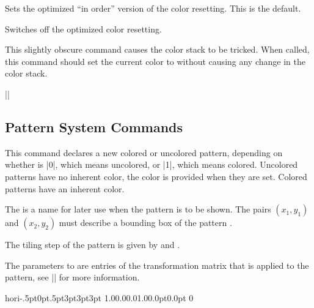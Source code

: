 \begin{command}{\pgfsys@color@reset@inordertrue}
    Sets the optimized ``in order'' version of the color resetting. This is the
    default.
\end{command}

\begin{command}{\pgfsys@color@reset@inorderfalse}
    Switches off the optimized color resetting.
\end{command}

\begin{command}{\pgfsys@color@unstacked{}}
    This slightly obscure command causes the color stack to be tricked. When
    called, this command should set the current color to 
    without causing any change in the color stack.

    \example ||
\end{command}


\subsection{Pattern System Commands}

\begin{command}{\pgfsys@declarepattern
    \allowbreak{}%
}
    This command declares a new colored or uncolored pattern, depending on
    whether  is |0|, which means uncolored, or |1|, which means
    colored. Uncolored patterns have no inherent color, the color is provided
    when they are set. Colored patterns have an inherent color.

    The  is a name for later use when the pattern is to be shown.
    The pairs $(x_1,y_1)$ and $(x_2,y_2)$ must describe a bounding box of the
    pattern .

    The tiling step of the pattern is given by  and .

    The parameters  to  are entries of the transformation
    matrix that is applied to the pattern, see |\pgfsys@patternmatrix| for more
    information.

    \example
\begin{codeexample}
\pgfsys@declarepattern
    {hori}{-.5pt}{0pt}{.5pt}{3pt}{3pt}{3pt}%
    {1.0}{0.0}{0.0}{1.0}{0.0pt}{0.0pt}%
    {\pgfsys@moveto{0pt}{0pt}\pgfsys@lineto{0pt}{3pt}\pgfsys@stroke}
    {0}
\end{codeexample}
\end{command}


